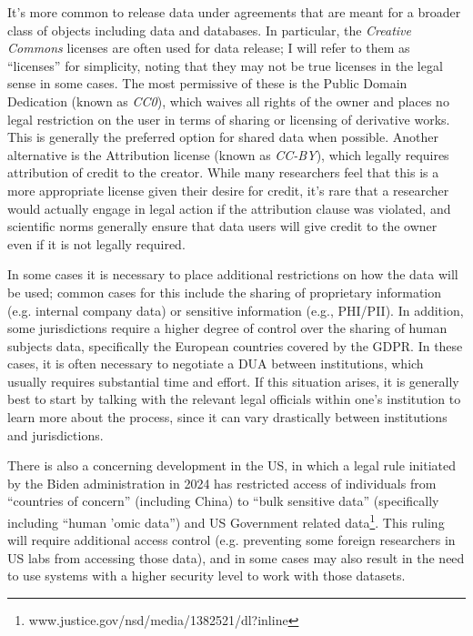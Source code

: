 It's more common to release data under agreements that are meant for a broader class of objects including data and databases.  In particular, the \textit{Creative Commons} licenses are often used for data release; I will refer to them as ``licenses'' for simplicity, noting that they may not be true licenses in the legal sense in some cases.  The most permissive of these is the Public Domain Dedication (known as \textit{CC0}), which waives all rights of the owner and places no legal restriction on the user in terms of sharing or licensing of derivative works.  This is generally the preferred option for shared data when possible. Another alternative is the Attribution license (known as \textit{CC-BY}), which legally requires attribution of credit to the creator.  While many researchers feel that this is a more appropriate license given their desire for credit, it's rare that a researcher would actually engage in legal action if the attribution clause was violated, and scientific norms generally ensure that data users will give credit to the owner even if it is not legally required.

In some cases it is necessary to place additional restrictions on how the data will be used; common cases for this include the sharing of proprietary information (e.g. internal company data) or sensitive information (e.g., PHI/PII). In addition, some jurisdictions require a higher degree of control over the sharing of human subjects data, specifically the European countries covered by the GDPR. In these cases, it is often necessary to negotiate a DUA between institutions, which usually requires substantial time and effort. If this situation arises, it is generally best to start by talking with the relevant legal officials within one's institution to learn more about the process, since it can vary drastically between institutions and jurisdictions.

There is also a concerning development in the US, in which a legal rule initiated by the Biden administration in 2024 has restricted access of individuals from ``countries of concern'' (including China) to ``bulk sensitive data'' (specifically including ``human 'omic data'') and US Government related data\footnote{www.justice.gov/nsd/media/1382521/dl?inline}. This ruling will require additional access control (e.g. preventing some foreign researchers in US labs from accessing those data), and in some cases may also result in the need to use systems with a higher security level to work with those datasets.

